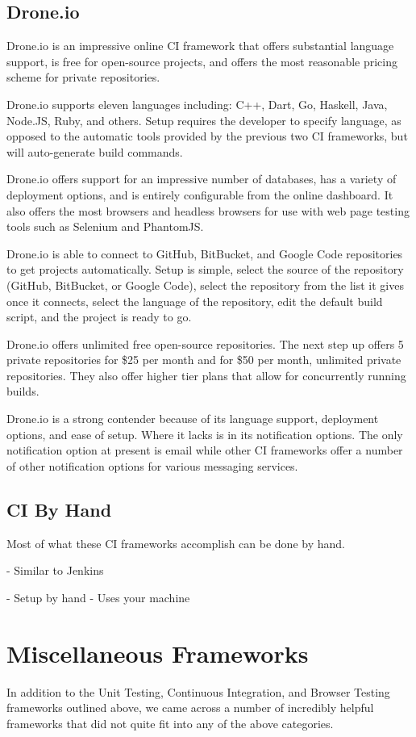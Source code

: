 \documentclass[12pt]{ucthesis}
\begin{document}
\subsection{Drone.io}
Drone.io\cite{DroneIO} is an impressive online CI framework that offers substantial language support, is free for open-source projects, and offers the most reasonable pricing scheme for private repositories.

Drone.io supports eleven languages including: C++, Dart, Go, Haskell, Java, Node.JS, Ruby, and others. Setup requires the developer to specify language, as opposed to the automatic tools provided by the previous two CI frameworks, but will auto-generate build commands.

Drone.io offers support for an impressive number of databases, has a variety of deployment options, and is entirely configurable from the online dashboard. It also offers the most browsers and headless browsers for use with web page testing tools such as Selenium and PhantomJS.

Drone.io is able to connect to GitHub, BitBucket, and Google Code repositories to get projects automatically. Setup is simple, select the source of the repository (GitHub, BitBucket, or Google Code), select the repository from the list it gives once it connects, select the language of the repository, edit the default build script, and the project is ready to go.

Drone.io offers unlimited free open-source repositories. The next step up offers 5 private repositories for \$25 per month and for \$50 per month, unlimited private repositories. They also offer higher tier plans that allow for concurrently running builds.

Drone.io is a strong contender because of its language support, deployment options, and ease of setup. Where it lacks is in its notification options. The only notification option at present is email while other CI frameworks offer a number of other notification options for various messaging services.

\subsection{CI By Hand}
Most of what these CI frameworks accomplish can be done by hand.

- Similar to Jenkins

- Setup by hand
- Uses your machine

\section{Miscellaneous Frameworks}
In addition to the Unit Testing, Continuous Integration, and Browser Testing frameworks outlined above, we came across a number of incredibly helpful frameworks that did not quite fit into any of the above categories.
\end{document}
